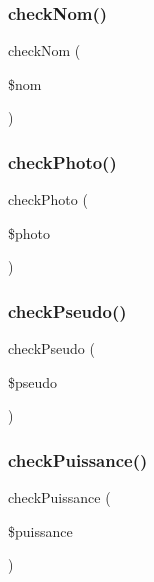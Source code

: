 \mbox{\label{functions_8php_a36d06bcf62ff365e391fcbfdf5a49c10}} 
\subsubsection{check\+Nom()}
{\footnotesize\ttfamily check\+Nom (\begin{DoxyParamCaption}\item[{}]{\$nom }\end{DoxyParamCaption})}

\mbox{\label{functions_8php_a79518b05f5ca37f38cf31137d4a99b1c}} 
\subsubsection{check\+Photo()}
{\footnotesize\ttfamily check\+Photo (\begin{DoxyParamCaption}\item[{}]{\$photo }\end{DoxyParamCaption})}

\mbox{\label{functions_8php_ad5402725bf859853bddafb20ef475b93}} 
\subsubsection{check\+Pseudo()}
{\footnotesize\ttfamily check\+Pseudo (\begin{DoxyParamCaption}\item[{}]{\$pseudo }\end{DoxyParamCaption})}

\mbox{\label{functions_8php_a7ba95c0524276f71d68b50e8beae94ee}} 
\subsubsection{check\+Puissance()}
{\footnotesize\ttfamily check\+Puissance (\begin{DoxyParamCaption}\item[{}]{\$puissance }\end{DoxyParamCaption})}


